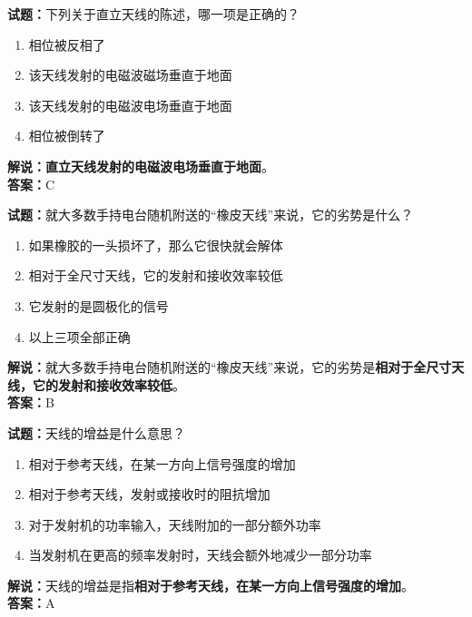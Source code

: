 \documentclass{ctexbook}
\begin{document}
\bigskip


\noindent\textbf{试题：}下列关于直立天线的陈述，哪一项是正确的？

\begin{enumerate}[leftmargin=3em]
	\item 相位被反相了
	\item 该天线发射的电磁波磁场垂直于地面
	\item 该天线发射的电磁波电场垂直于地面
	\item 相位被倒转了
\end{enumerate}

\noindent\textbf{解说：}\textbf{直立天线发射的电磁波电场垂直于地面}。\\\noindent\textbf{答案：}C


\bigskip


\noindent\textbf{试题：}就大多数手持电台随机附送的“橡皮天线”来说，它的劣势是什么？

\begin{enumerate}[leftmargin=3em]
	\item 如果橡胶的一头损坏了，那么它很快就会解体
	\item 相对于全尺寸天线，它的发射和接收效率较低
	\item 它发射的是圆极化的信号
	\item 以上三项全部正确
\end{enumerate}

\noindent\textbf{解说：}就大多数手持电台随机附送的“橡皮天线”来说，它的劣势是\textbf{相对于全尺寸天线，它的发射和接收效率较低}。\\\noindent\textbf{答案：}B


\bigskip


\noindent\textbf{试题：}天线的增益是什么意思？

\begin{enumerate}[leftmargin=3em]
	\item 相对于参考天线，在某一方向上信号强度的增加
	\item 相对于参考天线，发射或接收时的阻抗增加
	\item 对于发射机的功率输入，天线附加的一部分额外功率
	\item 当发射机在更高的频率发射时，天线会额外地减少一部分功率
\end{enumerate}

\noindent\textbf{解说：}天线的增益是指\textbf{相对于参考天线，在某一方向上信号强度的增加}。\\\noindent\textbf{答案：}A


\bigskip
\end{document}

